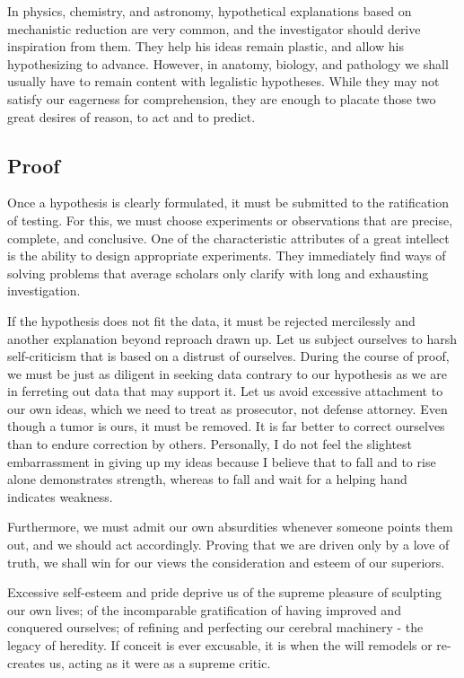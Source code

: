 \documentclass{article}
\begin{document}
In physics, chemistry, and astronomy, hypothetical explanations based on mechanistic reduction are very common, and the investigator should derive inspiration from them. They help his ideas remain plastic, and allow his hypothesizing to advance. However, in anatomy, biology, and pathology we shall usually have to remain content with legalistic hypotheses. While they may not satisfy our eagerness for comprehension, they are enough to placate those two great desires of reason, to act and to predict.

\subsection*{Proof}

Once a hypothesis is clearly formulated, it must be submitted to the ratification of testing. For this, we must choose experiments or observations that are precise, complete, and conclusive. One of the characteristic attributes of a great intellect is the ability to design appropriate experiments. They immediately find ways of solving problems that average scholars only clarify with long and exhausting investigation.

If the hypothesis does not fit the data, it must be rejected mercilessly and another explanation beyond reproach drawn up. Let us subject ourselves to harsh self-criticism that is based on a distrust of ourselves. During the course of proof, we must be just as diligent in seeking data contrary to our hypothesis as we are in ferreting out data that may support it. Let us avoid excessive attachment to our own ideas, which we need to treat as prosecutor, not defense attorney. Even though a tumor is ours, it must be removed. It is far better to correct ourselves than to endure correction by others. Personally, I do not feel the slightest embarrassment in giving up my ideas because I believe that to fall and to rise alone demonstrates strength, whereas to fall and wait for a helping hand indicates weakness.

Furthermore, we must admit our own absurdities whenever someone points them out, and we should act accordingly. Proving that we are driven only by a love of truth, we shall win for our views the consideration and esteem of our superiors.

Excessive self-esteem and pride deprive us of the supreme pleasure of sculpting our own lives; of the incomparable gratification of having improved and conquered ourselves; of refining and perfecting our cerebral machinery - the legacy of heredity. If conceit is ever excusable, it is when the will remodels or re-creates us, acting as it were as a supreme critic.
\end{document}
